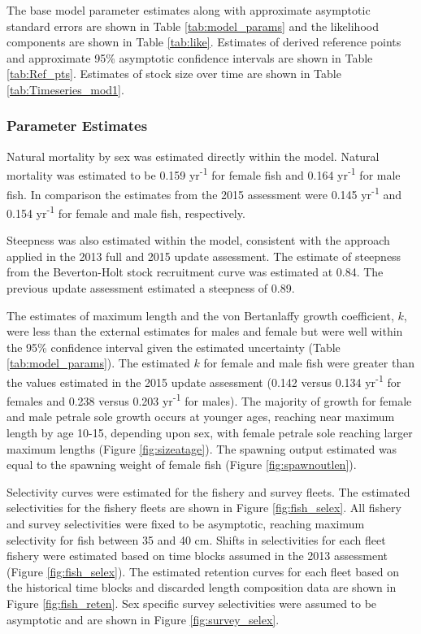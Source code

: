 \documentclass[12pt,]{article}
\begin{document}
The base model parameter estimates along with approximate asymptotic
standard errors are shown in Table \ref{tab:model_params} and the
likelihood components are shown in Table \ref{tab:like}. Estimates of
derived reference points and approximate 95\% asymptotic confidence
intervals are shown in Table \ref{tab:Ref_pts}. Estimates of stock size
over time are shown in Table \ref{tab:Timeseries_mod1}.

\subsubsection{Parameter Estimates}\label{parameter-estimates}

Natural mortality by sex was estimated directly within the model.
Natural mortality was estimated to be 0.159 yr\textsuperscript{-1} for
female fish and 0.164 yr\textsuperscript{-1} for male fish. In
comparison the estimates from the 2015 assessment were 0.145
yr\textsuperscript{-1} and 0.154 yr\textsuperscript{-1} for female and
male fish, respectively.

Steepness was also estimated within the model, consistent with the
approach applied in the 2013 full and 2015 update assessment. The
estimate of steepness from the Beverton-Holt stock recruitment curve was
estimated at 0.84. The previous update assessment estimated a steepness
of 0.89.

The estimates of maximum length and the von Bertanlaffy growth
coefficient, \(k\), were less than the external estimates for males and
female but were well within the 95\% confidence interval given the
estimated uncertainty (Table \ref{tab:model_params}). The estimated
\(k\) for female and male fish were greater than the values estimated in
the 2015 update assessment (0.142 versus 0.134 yr\textsuperscript{-1}
for females and 0.238 versus 0.203 yr\textsuperscript{-1} for males).
The majority of growth for female and male petrale sole growth occurs at
younger ages, reaching near maximum length by age 10-15, depending upon
sex, with female petrale sole reaching larger maximum lengths (Figure
\ref{fig:sizeatage}). The spawning output estimated was equal to the
spawning weight of female fish (Figure \ref{fig:spawnoutlen}).

Selectivity curves were estimated for the fishery and survey fleets. The
estimated selectivities for the fishery fleets are shown in Figure
\ref{fig:fish_selex}. All fishery and survey selectivities were fixed to
be asymptotic, reaching maximum selectivity for fish between 35 and 40
cm. Shifts in selectivities for each fleet fishery were estimated based
on time blocks assumed in the 2013 assessment (Figure
\ref{fig:fish_selex}). The estimated retention curves for each fleet
based on the historical time blocks and discarded length composition
data are shown in Figure \ref{fig:fish_reten}. Sex specific survey
selectivities were assumed to be asymptotic and are shown in Figure
\ref{fig:survey_selex}.
\end{document}
